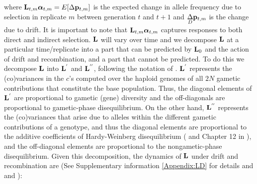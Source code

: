\documentclass[12pt]{article}
\begin{document}
\begin{bibunit}
where ${\bf L}_{t,m}\boldsymbol{\alpha}_{t,m}=E[\Delta{\bf p}_{t,m}]$ is the expected change in allele frequency due to selection in replicate $m$ between generation $t$ and $t+1$ and $\underset{D}\Delta {\bf p}_{t,m}$ is the change due to drift. It is important to note that ${\bf L}_{t,m}\boldsymbol{\alpha}_{t,m}$ captures responses to both direct and indirect selection. ${\bf L}$ will vary over time and we decompose ${\bf L}$ at a particular time/replicate into a part that can be predicted by ${\bf L}_0$ and the action of drift and recombination, and a part that cannot be predicted. To do this we decompose  ${\bf L}$ into ${\bf L}^{'}$ and ${\bf L}^{''}$, following the notation of \citet{buffalo2019linked}. ${\bf L}^{'}$ represents the (co)variances in the $c$'s computed over the haploid genomes of all $2N$ gametic contributions that constitute the base population. Thus, the diagonal elements of ${\bf L}^{'}$ are proportional to gametic (gene) diversity and the off-diagonals are proportional to gametic-phase disequilibrium. On the other hand, ${\bf L}^{''}$  represents the (co)variances that arise due to alleles within the different gametic contributions of a genotype, and thus the diagonal elements are proportional to the additive coefficients of Hardy-Weinberg disequilibrium (\citet{bulmer1980mathematical} and Chapter 12 in \citet{Weir.1989}), and the off-diagonal elements are proportional to the nongametic-phase disequilibrium. Given this decomposition, the dynamics of ${\bf L}$ under drift and recombination are (See Supplementary information \ref{Appendix:LD} for details and \citet{Hill.1968} and \citet{Santiago.1998}):


\end{bibunit}
\end{document}
